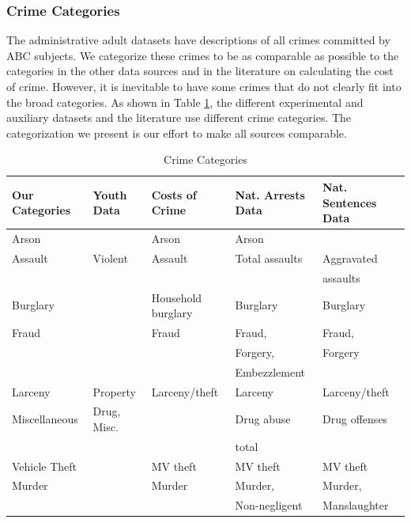 \subsubsection{Crime Categories}
\noindent The administrative adult datasets have descriptions of all crimes committed by ABC subjects. We categorize these crimes to be as comparable as possible to the categories in the other data sources and in the literature on calculating the cost of crime. However, it is inevitable to have some crimes that do not clearly fit into the broad categories. As shown in Table \ref{tab:crime_cat}, the different experimental and auxiliary datasets and the literature use different crime categories. The categorization we present is our effort to make all sources comparable. \\

\begin{table}[H]
\begin{threeparttable}
\scriptsize \caption{Crime Categories} \label{tab:crime_cat}
\begin{tabular}{lllll}
\toprule
{Our Categories}	&	{Youth Data} & {Costs of Crime} & {Nat. Arrests Data} & {Nat. Sentences Data}	\\
\midrule
{Arson}			&			& Arson					&	Arson			&					\\	
{Assault}			&	Violent			& Assault				&	Total assaults	& Aggravated 		\\		
				&				&						&					& assaults 			\\ 		
{Burglary}		&				& Household burglary	&	Burglary		& Burglary			\\		
{Fraud}			&				& Fraud					&	Fraud,			& Fraud,			\\		
				&				&						&	Forgery,		& Forgery			\\
				&				&						&	Embezzlement	&					\\		
{Larceny}			&	Property	& Larceny/theft			&	Larceny			& Larceny/theft		\\		
{Miscellaneous}	& 	Drug, Misc.	& 					&	Drug abuse		& Drug offenses		\\		
				&				&						&	total			&					\\ 		
{Vehicle Theft}	&				& MV theft	&	MV theft		& MV theft			\\		
{Murder}			&				& Murder				&	Murder,			& Murder,			\\	
				&				&						& 	Non-negligent 	& Manslaughter		\\

\end{tabular}
\end{threeparttable}
\end{table}
